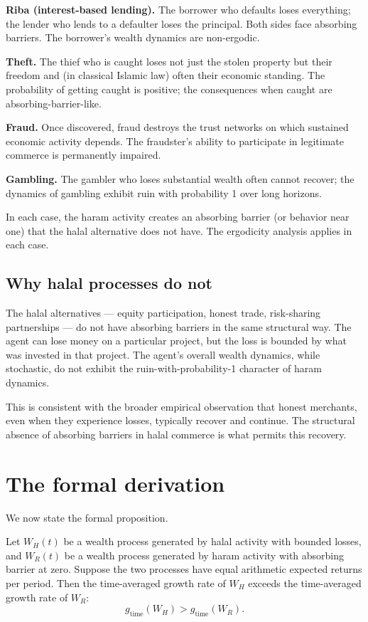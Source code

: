 \textbf{Riba (interest-based lending).} The borrower who defaults
loses everything; the lender who lends to a defaulter loses the
principal. Both sides face absorbing barriers. The borrower's
wealth dynamics are non-ergodic.

\textbf{Theft.} The thief who is caught loses not just the stolen
property but their freedom and (in classical Islamic law) often
their economic standing. The probability of getting caught is
positive; the consequences when caught are absorbing-barrier-like.

\textbf{Fraud.} Once discovered, fraud destroys the trust networks
on which sustained economic activity depends. The fraudster's
ability to participate in legitimate commerce is permanently
impaired.

\textbf{Gambling.} The gambler who loses substantial wealth often
cannot recover; the dynamics of gambling exhibit ruin with
probability 1 over long horizons.

In each case, the haram activity creates an absorbing barrier (or
behavior near one) that the halal alternative does not have. The
ergodicity analysis applies in each case.

\subsection{Why halal processes do not}

The halal alternatives --- equity participation, honest trade,
risk-sharing partnerships --- do not have absorbing barriers in
the same structural way. The agent can lose money on a particular
project, but the loss is bounded by what was invested in that
project. The agent's overall wealth dynamics, while stochastic,
do not exhibit the ruin-with-probability-1 character of haram
dynamics.

This is consistent with the broader empirical observation that
honest merchants, even when they experience losses, typically
recover and continue. The structural absence of absorbing barriers
in halal commerce is what permits this recovery.

\section{The formal derivation}
\label{sec:halal-derivation}

We now state the formal proposition.

\begin{theorem}
\label{thm:halal-dominance}
Let $W_H(t)$ be a wealth process generated by halal activity with
bounded losses, and $W_R(t)$ be a wealth process generated by
haram activity with absorbing barrier at zero. Suppose the two
processes have equal arithmetic expected returns per period. Then
the time-averaged growth rate of $W_H$ exceeds the time-averaged
growth rate of $W_R$:
\[
    g_{\text{time}}(W_H) > g_{\text{time}}(W_R).
\]
\end{theorem}

